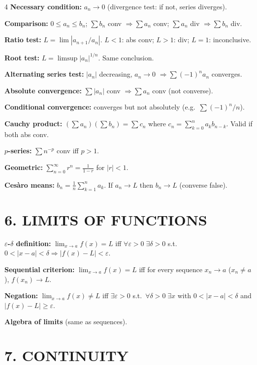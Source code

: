 \documentclass[8pt,a4paper,landscape]{extarticle}
\begin{document}
\begin{multicols}{4}
\textbf{Necessary condition:} $a_n\to0$ (divergence test: if not, series diverges).

\textbf{Comparison:} $0\leq a_n\leq b_n$; $\sum b_n$ conv $\Rightarrow\sum a_n$ conv; $\sum a_n$ div $\Rightarrow\sum b_n$ div.

\textbf{Ratio test:} $L=\lim|a_{n+1}/a_n|$. $L<1$: abs conv; $L>1$: div; $L=1$: inconclusive.

\textbf{Root test:} $L=\limsup|a_n|^{1/n}$. Same conclusion.

\textbf{Alternating series test:} $|a_n|$ decreasing, $a_n\to0$ $\Rightarrow\sum(-1)^na_n$ converges.

\textbf{Absolute convergence:} $\sum|a_n|$ conv $\Rightarrow\sum a_n$ conv (not converse).

\textbf{Conditional convergence:} converges but not absolutely (e.g.\ $\sum(-1)^n/n$).

\textbf{Cauchy product:} $(\sum a_n)(\sum b_n)=\sum c_n$ where $c_n=\sum_{k=0}^n a_k b_{n-k}$. Valid if both abs conv.

\textbf{$p$-series:} $\sum n^{-p}$ conv iff $p>1$.

\textbf{Geometric:} $\sum_{n=0}^\infty r^n=\frac{1}{1-r}$ for $|r|<1$.

\textbf{Ces\`aro means:} $b_n=\frac{1}{n}\sum_{k=1}^n a_k$. If $a_n\to L$ then $b_n\to L$ (converse false).

\section*{6. LIMITS OF FUNCTIONS}

\textbf{$\varepsilon$-$\delta$ definition:} $\lim_{x\to a}f(x)=L$ iff $\forall\varepsilon>0\;\exists\delta>0$ s.t.\ $0<|x-a|<\delta\Rightarrow|f(x)-L|<\varepsilon$.

\textbf{Sequential criterion:} $\lim_{x\to a}f(x)=L$ iff for every sequence $x_n\to a$ ($x_n\neq a$), $f(x_n)\to L$.

\textbf{Negation:} $\lim_{x\to a}f(x)\neq L$ iff $\exists\varepsilon>0$ s.t.\ $\forall\delta>0\;\exists x$ with $0<|x-a|<\delta$ and $|f(x)-L|\geq\varepsilon$.

\textbf{Algebra of limits} (same as sequences).

\section*{7. CONTINUITY}


\end{multicols}
\end{document}
